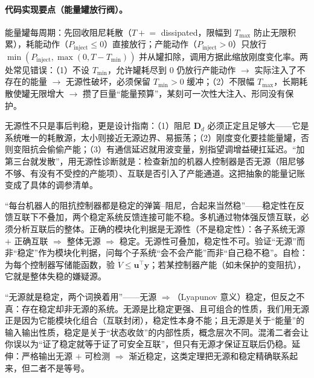 \paragraph{代码实现要点（能量罐放行阀）。}
能量罐每周期：先回收阻尼耗散（$T\mathrel{+}=$ dissipated，限幅到 $T_{\max}$ 防止无限积累），耗能动作（$P_{\text{inject}}\le 0$）直接放行；产能动作（$P_{\text{inject}}>0$）只放行 $\min(P_{\text{inject}},\max(0,T-T_{\min}))$ 并从罐扣除，调用方据此缩放刚度变化率。两处常见错误：（1）不设 $T_{\min}$，允许罐耗尽到 $0$ 仍放行产能动作 $\to$ 实际注入了不存在的能量 $\to$ 无源性破坏，必须保留 $T_{\min}>0$ 缓冲；（2）不限幅 $T_{\max}$，长期耗散使罐无限增大 $\to$ 攒了巨量“能量预算”，某刻可一次性大注入、形同没有保护。

\begin{insight}[无源性如何指导你调多机搬运的增益]
无源性不只是事后判稳，更是设计指南：（1）阻尼 $\mathbf{D}_d$ 必须正定且足够大——它是系统唯一的耗散源，太小则接近无源边界、易振荡；（2）刚度变化要挂能量罐，否则变阻抗会偷偷产能；（3）有通信延迟就用波变量，别指望调增益硬扛延迟。“加第三台就发散”，用无源性诊断就是：检查新加的机器人控制器是否无源（阻尼够不够、有没有不受控的产能项）、互联是否引入了产能通道。这把抽象的能量记账变成了具体的调参清单。
\end{insight}

\begin{pitfall}
“每台机器人的阻抗控制器都是稳定的弹簧–阻尼，合起来当然稳”——稳定性在反馈互联下不叠加，两个稳定系统反馈连接可能不稳。多机通过物体强反馈互联，必须分析互联后的整体。正确的模块化判据是无源性（不是稳定性）：各子系统无源 $+$ 正确互联 $\Rightarrow$ 整体无源 $\Rightarrow$ 稳定。无源性可叠加，稳定性不可。验证“无源”而非“稳定”作为模块化判据，问每个子系统“会不会产能”而非“自己稳不稳”。自检：为每个控制器写储能函数，验 $\dot V\le\mathbf{u}^\top\mathbf{y}$；若某控制器产能（如未保护的变阻抗），它就是整体失稳的嫌疑源。
\end{pitfall}

\begin{pitfall}
“无源就是稳定，两个词换着用”——无源 $\Rightarrow$（Lyapunov 意义）稳定，但反之不真：存在稳定却非无源的系统。无源是比稳定更强、且可组合的性质，我们用无源正是因为它能模块化组合（互联封闭），稳定性本身不能；且无源是关于“能量”的输入输出性质，稳定是关于“状态收敛”的内部性质，概念层次不同。混淆二者会让你误以为“证了稳定就等于证了可安全互联”，但只有无源才保证互联后仍稳。延伸：严格输出无源 $+$ 可检测 $\Rightarrow$ 渐近稳定，这类定理把无源和稳定精确联系起来，但二者不是等号。
\end{pitfall}

